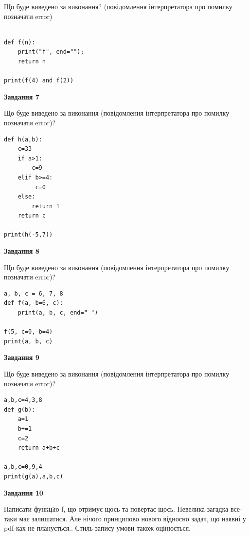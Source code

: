 \documentclass[12pt, ukrainian]{article}
\begin{document}
{\begin {large}
Що буде виведено за виконання? (повідомлення інтерпретатора про помилку позначати error)\par
\begin{verbatim}

def f(n):
    print("f", end="");
    return n

print(f(4) and f(2))
\end{verbatim}

{\begin {center}\textbf{Завдання 7}\end {center}}

Що буде виведено за виконання (повідомлення інтерпретатора про помилку позначати error)?\par
\begin{verbatim}
def h(a,b):
    c=33
    if a>1:
        c=9
    elif b>=4:
         c=0
    else: 
        return 1
    return c

print(h(-5,7))
\end{verbatim}

{\begin {center}\textbf{Завдання 8}\end {center}}

Що буде виведено за виконання (повідомлення інтерпретатора про помилку позначати error)?\par
\begin{verbatim}
a, b, c = 6, 7, 8
def f(a, b=6, c):
    print(a, b, c, end=" ")

f(5, c=0, b=4)
print(a, b, c)
\end{verbatim}

{\begin {center}\textbf{Завдання 9}\end {center}}

Що буде виведено за виконання (повідомлення інтерпретатора про помилку позначати error)?\par
\begin{verbatim}
a,b,c=4,3,8
def g(b):
    a=1
    b+=1
    c=2
    return a+b+c

a,b,c=0,9,4
print(g(a),a,b,c)
\end{verbatim}

{\begin {center}\textbf{Завдання 10}\end {center}}


Написати функцiю f, що отримує щось та повертає щось. Невелика загадка все-таки має залишатися. Але нічого принципово нового відносно задач, що наявні у pdf-ках не планується.. Стиль запису умови також оцінюється.\par
\end {large}}
\newpage
\end{document}
